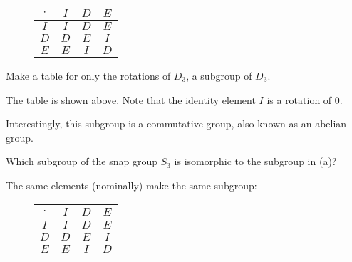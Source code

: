 \documentclass[../gatm_answers.tex]{subfiles}
\begin{document}
\begin{figure}[h]
	\begin{center}
		\begin{minipage}[b]{\textwidth}
			\centering
			\begin{tabular}{c|ccc}
				\hline
				$\cdot$ & $I$ & $D$ & $E$ \\ \hline
				\rowcolor{light-gray}
				$I$ & $I$ & $D$ & $E$ \\
				$D$ & $D$ & $E$ & $I$ \\
				\rowcolor{light-gray}
				$E$ & $E$ & $I$ & $D$ \\ \hline
			\end{tabular}
			\vspace*{0.5\baselineskip}
		\end{minipage}
	\end{center}
	\vspace*{-2\baselineskip}
\end{figure}

\begin{outer_problem}
\item
\begin{inner_problem}[start=1,leftmargin=25pt]
	\item Make a table for only the rotations of $D_3$, a subgroup of $D_3$.
\end{inner_problem}
\end{outer_problem}

\noindent The table is shown above. Note that the identity element $I$ is a rotation of $0$.

Interestingly, this subgroup is a commutative group, also known as an abelian group.

\begin{inner_problem}
\item Which subgroup of the snap group $S_3$ is isomorphic to the subgroup in (a)?
\end{inner_problem}

\noindent The same elements (nominally) make the same subgroup:

\begin{figure}[h]
	\begin{center}
		\begin{minipage}[b]{\textwidth}
			\centering
			\begin{tabular}{c|ccc}
				\hline
				$\cdot$ & $I$ & $D$ & $E$ \\ \hline
				\rowcolor{light-gray}
				$I$ & $I$ & $D$ & $E$ \\
				$D$ & $D$ & $E$ & $I$ \\
				\rowcolor{light-gray}
				$E$ & $E$ & $I$ & $D$ \\ \hline
			\end{tabular}
			\vspace*{0.5\baselineskip}
		\end{minipage}
	\end{center}
	\vspace*{-2\baselineskip}
\end{figure}
\end{document}
